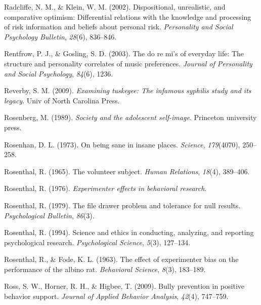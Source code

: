 \documentclass[
]{krantz}
\newlength{\cslhangindent}
\newlength{\cslentryspacingunit} %
\newenvironment{CSLReferences}[2] %
 {%
  \setlength{\parindent}{0pt}
  \ifodd #1
  \let\oldpar\par
  \def\par{\hangindent=\cslhangindent\oldpar}
  \fi
  \setlength{\parskip}{#2\cslentryspacingunit}
 }%
 {}
\begin{document}
\begin{CSLReferences}{1}{0}
\leavevmode{}%
Radcliffe, N. M., \& Klein, W. M. (2002). Dispositional, unrealistic, and comparative optimism: Differential relations with the knowledge and processing of risk information and beliefs about personal risk. \emph{Personality and Social Psychology Bulletin}, \emph{28}(6), 836--846.

\leavevmode{}%
Rentfrow, P. J., \& Gosling, S. D. (2003). The do re mi's of everyday life: The structure and personality correlates of music preferences. \emph{Journal of Personality and Social Psychology}, \emph{84}(6), 1236.

\leavevmode{}%
Reverby, S. M. (2009). \emph{Examining tuskegee: The infamous syphilis study and its legacy}. Univ of North Carolina Press.

\leavevmode{}%
Rosenberg, M. (1989). \emph{Society and the adolescent self-image}. Princeton university press.

\leavevmode{}%
Rosenhan, D. L. (1973). On being sane in insane places. \emph{Science}, \emph{179}(4070), 250--258.

\leavevmode{}%
Rosenthal, R. (1965). The volunteer subject. \emph{Human Relations}, \emph{18}(4), 389--406.

\leavevmode{}%
Rosenthal, R. (1976). \emph{Experimenter effects in behavioral research}.

\leavevmode{}%
Rosenthal, R. (1979). The file drawer problem and tolerance for null results. \emph{Psychological Bulletin}, \emph{86}(3).

\leavevmode{}%
Rosenthal, R. (1994). Science and ethics in conducting, analyzing, and reporting psychological research. \emph{Psychological Science}, \emph{5}(3), 127--134.

\leavevmode{}%
Rosenthal, R., \& Fode, K. L. (1963). The effect of experimenter bias on the performance of the albino rat. \emph{Behavioral Science}, \emph{8}(3), 183--189.

\leavevmode{}%
Ross, S. W., Horner, R. H., \& Higbee, T. (2009). Bully prevention in positive behavior support. \emph{Journal of Applied Behavior Analysis}, \emph{42}(4), 747--759.


\end{CSLReferences}
\end{document}
